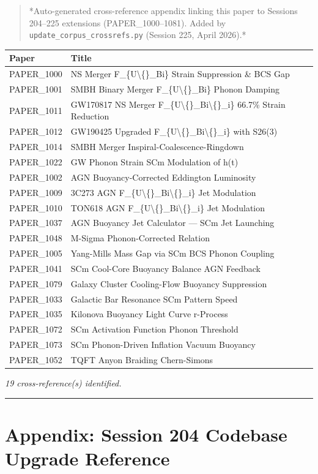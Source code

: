 \documentclass[11pt]{article}
\begin{document}
\begin{quote}
*Auto-generated cross-reference appendix linking this paper to
Sessions 204--225 extensions (PAPER\_1000--1081). Added by
\verb|update_corpus_crossrefs.py| (Session 225, April 2026).*
\end{quote}

\begin{center}
\begin{longtable}{ll}
\toprule
Paper & Title \tabularnewline
\midrule
\endhead
PAPER\_1000 & NS Merger F\_\{U\textbackslash\{\}\_Bi\} Strain Suppression \& BCS Gap \tabularnewline
PAPER\_1001 & SMBH Binary Merger F\_\{U\textbackslash\{\}\_Bi\} Phonon Damping \tabularnewline
PAPER\_1011 & GW170817 NS Merger F\_\{U\textbackslash\{\}\_Bi\textbackslash\{\}\_i\} 66.7\% Strain Reduction \tabularnewline
PAPER\_1012 & GW190425 Upgraded F\_\{U\textbackslash\{\}\_Bi\textbackslash\{\}\_i\} with S26(3) \tabularnewline
PAPER\_1014 & SMBH Merger Inspiral-Coalescence-Ringdown \tabularnewline
PAPER\_1022 & GW Phonon Strain SCm Modulation of h(t) \tabularnewline
PAPER\_1002 & AGN Buoyancy-Corrected Eddington Luminosity \tabularnewline
PAPER\_1009 & 3C273 AGN F\_\{U\textbackslash\{\}\_Bi\textbackslash\{\}\_i\} Jet Modulation \tabularnewline
PAPER\_1010 & TON618 AGN F\_\{U\textbackslash\{\}\_Bi\textbackslash\{\}\_i\} Jet Modulation \tabularnewline
PAPER\_1037 & AGN Buoyancy Jet Calculator --- SCm Jet Launching \tabularnewline
PAPER\_1048 & M-Sigma Phonon-Corrected Relation \tabularnewline
PAPER\_1005 & Yang-Mills Mass Gap via SCm BCS Phonon Coupling \tabularnewline
PAPER\_1041 & SCm Cool-Core Buoyancy Balance AGN Feedback \tabularnewline
PAPER\_1079 & Galaxy Cluster Cooling-Flow Buoyancy Suppression \tabularnewline
PAPER\_1033 & Galactic Bar Resonance SCm Pattern Speed \tabularnewline
PAPER\_1035 & Kilonova Buoyancy Light Curve r-Process \tabularnewline
PAPER\_1072 & SCm Activation Function Phonon Threshold \tabularnewline
PAPER\_1073 & SCm Phonon-Driven Inflation Vacuum Buoyancy \tabularnewline
PAPER\_1052 & TQFT Anyon Braiding Chern-Simons \tabularnewline
\bottomrule
\end{longtable}
\end{center}

\emph{19 cross-reference(s) identified.}

\noindent\rule{\textwidth}{0.4pt}

\section*{Appendix: Session 204 Codebase Upgrade Reference}
\end{document}
